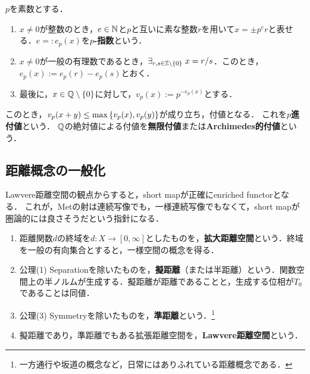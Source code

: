 \documentclass[uplatex,dvipdfmx]{jsreport}
\begin{document}
\begin{example}
    $p$を素数とする．
    \begin{enumerate}
        \item $x\ne0$が整数のとき，$e\in\mathbb{N}$と$p$と互いに素な整数$r$を用いて$x=\pm p^er$と表せる．$e=:e_p(x)$を\textbf{$p$-指数}という．
        \item $x\ne0$が一般の有理数であるとき，$\exists_{r,s\in\mathbb{Z}\setminus\{0\}}\;x=r/s$．このとき，$e_p(x):=e_p(r)-e_p(s)$とおく．
        \item 最後に，$x\in\mathbb{Q}\setminus\{0\}$に対して，$v_p(x):=p^{-e_p(x)}$とする．
    \end{enumerate}
    このとき，$v_p(x+y)\le\max\left\{v_p(x),v_p(y)\right\}$が成り立ち，付値となる．
    これを\textbf{$p$進付値}という．
    $\mathbb{Q}$の絶対値による付値を\textbf{無限付値}または\textbf{Archimedes的付値}という．
\end{example}

\begin{theorem}[付値が定める距離空間]
    
\end{theorem}

\subsection{距離概念の一般化}

\begin{tcolorbox}[colframe=ForestGreen, colback=ForestGreen!10!white,breakable,colbacktitle=ForestGreen!40!white,coltitle=black,fonttitle=\bfseries\sffamily,
    title=]
        Lawvere距離空間の観点からすると，short mapが正確にenriched functorとなる．
        これが，Metの射は連続写像でも，一様連続写像でもなくて，short mapが圏論的には良さそうだという指針になる．
\end{tcolorbox}

\begin{definition}\mbox{}
    \begin{enumerate}
        \item 距離関数$d$の終域を$d:X\to[0,\infty]$としたものを，\textbf{拡大距離空間}という．終域を一般の有向集合とすると，一様空間の概念を得る．
        \item 公理(1) Separationを除いたものを，\textbf{擬距離}（または半距離）という．関数空間上の半ノルムが生成する．擬距離が距離であることと，生成する位相が$T_0$であることは同値．
        \item 公理(3) Symmetryを除いたものを，\textbf{準距離}という．\footnote{一方通行や坂道の概念など，日常にはありふれている距離概念である．}
        \item 擬距離であり，準距離でもある拡張距離空間を，\textbf{Lawvere距離空間}という．
    \end{enumerate}
\end{definition}
\end{document}
